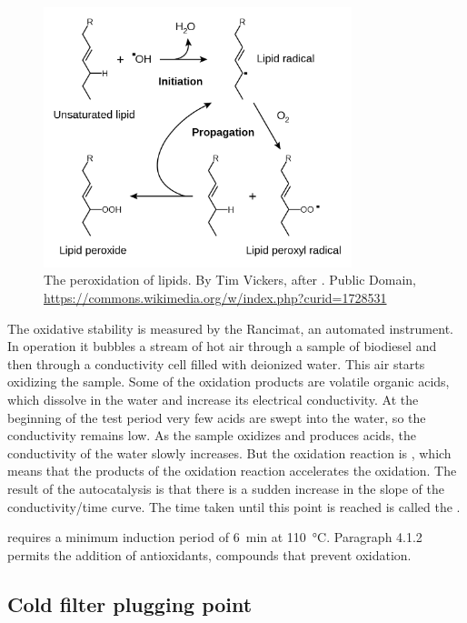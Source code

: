 \begin{figure}
\centering
\includegraphics[width=0.8\textwidth]{Figures/1281px-Lipid_peroxidation.png}
\decoRule

\caption[The peroxidation of lipids.]{The peroxidation of lipids. By Tim
Vickers, after \autocite{Young2001}. Public Domain,
\url{https://commons.wikimedia.org/w/index.php?curid=1728531}}

\label{fig:RancidRadical}
\end{figure}

The oxidative stability is measured by the Rancimat, an automated instrument. In
operation it bubbles a stream of hot air through a sample of biodiesel and then
through a conductivity cell filled with deionized water. This air starts
oxidizing the sample. Some of the oxidation products are volatile organic acids,
which dissolve in the water and increase its electrical conductivity. At the
beginning of the test period very few acids are swept into the water, so the
conductivity remains low. As the sample oxidizes and produces acids, the
conductivity of the water slowly increases. But the oxidation reaction is
, which means that the products of the oxidation reaction
accelerates the oxidation. The result of the autocatalysis is that there is a
sudden increase in the slope of the conductivity/time curve. The time taken
until this point is reached is called the .

 requires a minimum induction period of \SI{6}{\minute} at
\SI{110}{\celsius}. Paragraph 4.1.2 permits the addition of antioxidants,
compounds that prevent oxidation.

\subsection{Cold filter plugging point}

